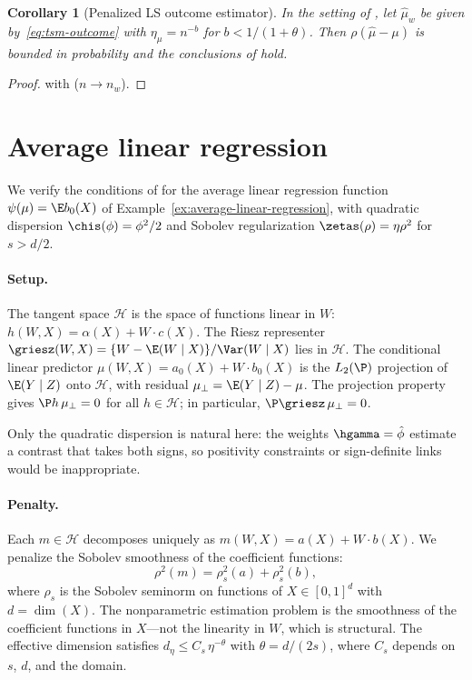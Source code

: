 \documentclass{article}
\newtheorem{corollary}[theorem]{Corollary}
\begin{document}
\begin{corollary}[Penalized LS outcome estimator]
\label{cor:tsm-outcome}
In the setting of ,
let $\hat\mu_w$ be given by~\eqref{eq:tsm-outcome}
with $\eta_\mu = n^{-b}$
for $b < 1/(1+\theta)$.
Then $\rho(\hat\mu - \mu)$
is bounded in probability
and the conclusions of
 hold.
\end{corollary}

\begin{proof}
with 
($n \to n_w$).
\end{proof}

\section{Average linear regression}
\label{sec:app-regression}

We verify the conditions of 
for the average linear regression function
$\psi(\mu) = \E b_0(X)$
of Example~\ref{ex:average-linear-regression},
with quadratic dispersion $\chis(\phi) = \phi^2/2$
and Sobolev regularization
$\zetas(\rho) = \eta\rho^2$
for $s > d/2$.

\paragraph{Setup.}
The tangent space $\mathcal{H}$
is the space of functions linear in $W$:
$h(W,X) = \alpha(X) + W \cdot c(X)$.
The Riesz representer
$\griesz(W,X)
  = \{W - \E(W \mid X)\}/\Var(W \mid X)$
lies in $\mathcal{H}$.
The conditional linear predictor
$\mu(W,X) = a_0(X) + W \cdot b_0(X)$
is the $L_2(\P)$ projection of $\E(Y \mid Z)$
onto $\mathcal{H}$,
with residual
$\mu_\perp = \E(Y \mid Z) - \mu$.
The projection property gives
$\P h\,\mu_\perp = 0$
for all $h \in \mathcal{H}$;
in particular, $\P\griesz\,\mu_\perp = 0$.

Only the quadratic dispersion is natural here:
the weights $\hgamma = \hat\phi$
estimate a contrast that takes both signs,
so positivity constraints
or sign-definite links would be inappropriate.

\paragraph{Penalty.}
Each $m \in \mathcal{H}$
decomposes uniquely as
$m(W,X) = a(X) + W \cdot b(X)$.
We penalize the Sobolev smoothness
of the coefficient functions:
\begin{equation}\label{eq:regression-penalty}
\rho^2(m) = \rho_s^2(a) + \rho_s^2(b),
\end{equation}
where $\rho_s$ is the Sobolev seminorm
on functions of $X \in [0,1]^d$
with $d = \dim(X)$.
The nonparametric estimation problem
is the smoothness of the coefficient functions
in $X$---not the linearity in $W$,
which is structural.
The effective dimension satisfies
$d_\eta \le C_s\, \eta^{-\theta}$
with $\theta = d/(2s)$,
where $C_s$ depends on $s$, $d$,
and the domain.
\end{document}
